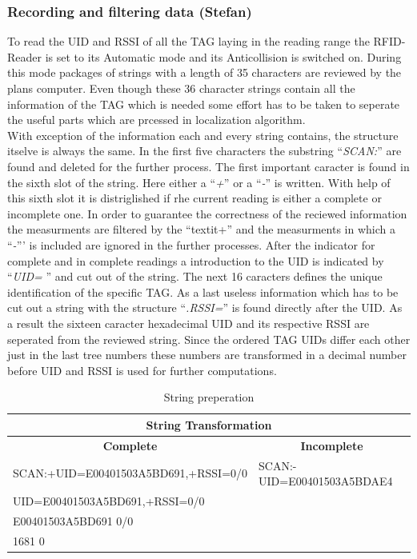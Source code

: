\subsubsection{Recording and filtering data (Stefan)}
To read the UID and RSSI of all the TAG laying in the reading range the RFID-Reader is set to its Automatic mode and its Anticollision is switched on. During this mode packages of strings with a length of 35 characters are reviewed by the plans computer. Even though these 36 character strings contain all the information of the TAG which is needed some effort has to be taken to seperate the useful parts which are prcessed in localization algorithm.\\
With exception of the information each and every string contains, the structure itselve is always the same. In the first five characters the substring ``\textit{SCAN:}'' are found and deleted for the further process. The first important caracter is found in the sixth slot of the string. Here either a ``\textit{+}'' or a ``\textit{-}'' is written. With help of this sixth slot it is distriglished if rhe current reading is either a complete or incomplete one. In order to guarantee the correctness of the reciewed information the measurments are filtered by the ``textit{+}'' and the measurments in which a ``\textit{-}''' is included are ignored in the further processes. After the indicator for complete and in complete readings a introduction to the UID is indicated by  ``\textit{UID=} '' and cut out of the string. The next 16 caracters defines the unique identification of the specific TAG. As a last useless information which has to be cut out a string with the structure ``\textit{.RSSI=}'' is found directly after the UID. As a result the sixteen caracter hexadecimal UID and its respective RSSI are seperated from the reviewed string. Since the ordered TAG UIDs differ each other just in the last tree numbers these numbers are transformed in a decimal number before UID and RSSI is used for further computations.\\
\begin{table}[]
\centering
\begin{tabular}{|l|l|}
\hline
\multicolumn{2}{|c|}{\textbf{String Transformation}}                               \\ \hline
\multicolumn{1}{|c|}{\textbf{Complete}} & \multicolumn{1}{c|}{\textbf{Incomplete}} \\ \hline
SCAN:+UID=E00401503A5BD691,+RSSI=0/0    & SCAN:-UID=E00401503A5BDAE4               \\ \hline
UID=E00401503A5BD691,+RSSI=0/0          &                                          \\ \hline
E00401503A5BD691 0/0                    &                                          \\ \hline
1681 0                                  &                                          \\ \hline
\end{tabular}
\caption{String preperation}
\label{string_prep}
\end{table}
